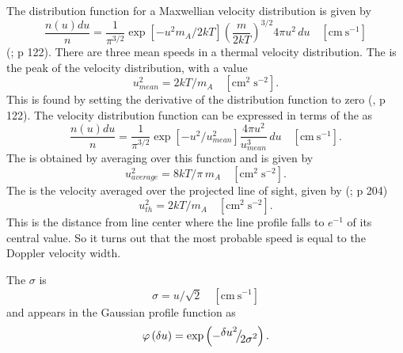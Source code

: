 The distribution function for a Maxwellian velocity distribution is
given by
\begin{equation}
\frac{{n\left( u \right)du}}{n} = \frac{1}{{{\pi ^{3/2}}}}\exp \left[
{ - {{{u^2}{m_A}} /
{2kT}}}
\right]{\left( {\frac{m}{{2kT}}}
\right)^{3/2}}4\pi {u^2}\,du\quad [\mathrm{cm~s}^{-1}]
\end{equation}
(\citealp{Novotny1973}; p 122).
There are three mean speeds in a thermal velocity
distribution.  The  is the peak
of the velocity
distribution, with a value
\begin{equation}
u_{mean}^2 = 2kT/{m_A}\quad[\mathrm{cm}^2 \; \mathrm{s}^{-2}].
\end{equation}
This is found by setting the derivative of the distribution function to
zero (\citealp{Novotny1973}, p 122).
The velocity distribution function can be
expressed in terms of the  as
\begin{equation}
\frac{{n\left( u \right)du}}{n} = \frac{1}{{{\pi ^{3/2}}}}\exp \left[
{ - {{{u^2}} /{u_{mean}^2}}}\right]\frac{{4\pi
{u^2}}}{{u_{mean}^3}}\,du\quad [\mathrm{cm~s}^{-1}].
\end{equation}
The  is obtained by averaging over this function
and is given by
\begin{equation}
u_{average}^2 =8kT/\pi\, m_A\quad [\mathrm{cm}^2 \; \mathrm{s}^{-2}].%
\end{equation}
The  is the
velocity averaged over the
projected line of sight, given by (\citealp{Novotny1973}; p 204)
\begin{equation}
u_{th}^2 = 2kT/{m_A}
\quad [\mathrm{cm}^2 \; \mathrm{s}^{-2}].
\end{equation}
This is the distance from line center where the line profile
falls to $e^{-1}$ of its central value.
So it turns out that the most probable speed is equal
to the Doppler velocity width.

The  $\sigma$ is
\begin{equation}
\sigma  = u/\sqrt 2
\quad [\mathrm{cm~s}^{-1}]%
\end{equation}
and appears in the Gaussian profile function as
\begin{equation}
\varphi \left( {\delta u} \right) = \exp \left( { -
{\raise0.7ex\hbox{${\delta {u^2}}$} \!\mathord{\left/
 {\vphantom {{\delta {u^2}} {2{\sigma ^2}}}}\right.\kern-\nulldelimiterspace}
\!\lower0.7ex\hbox{${2{\sigma ^2}}$}}} \right).%
\end{equation}

